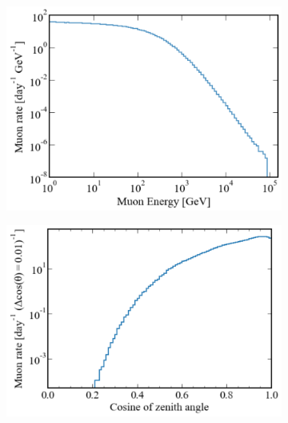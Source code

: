 \begin{figure}[h!]
    \centering
    \begin{subfigure}[c]{0.49\textwidth}
        \centering
        \includegraphics[width=\textwidth]{figures/Muons/Primary_energyLZstyle.pdf}
        \caption{}
        \label{fig:Muons/Prim_E}
    \end{subfigure}
    \begin{subfigure}[c]{0.49\textwidth}  
        \centering 
        \includegraphics[width=\textwidth]{figures/Muons/cosZ_LZstyle.pdf}
        \caption{}
        \label{fig:Muons/cosZ}
    \end{subfigure}
    \begin{subfigure}[c]{0.49\textwidth}   
        \centering 

\end{subfigure}
\end{figure}
